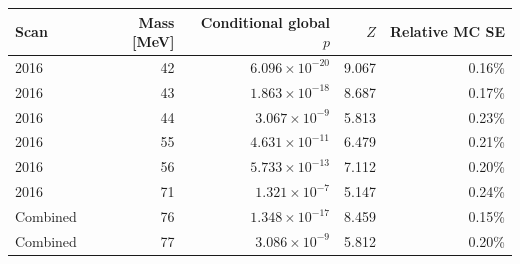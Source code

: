 \begin{tabular}{lrrrr}\toprule
Scan & Mass [MeV] & Conditional global $p$ & $Z$ & Relative MC SE\\\midrule
2016 & 42 & $6.096\times10^{-20}$ & 9.067 & 0.16\%\\
2016 & 43 & $1.863\times10^{-18}$ & 8.687 & 0.17\%\\
2016 & 44 & $3.067\times10^{-9}$ & 5.813 & 0.23\%\\
2016 & 55 & $4.631\times10^{-11}$ & 6.479 & 0.21\%\\
2016 & 56 & $5.733\times10^{-13}$ & 7.112 & 0.20\%\\
2016 & 71 & $1.321\times10^{-7}$ & 5.147 & 0.24\%\\
Combined & 76 & $1.348\times10^{-17}$ & 8.459 & 0.15\%\\
Combined & 77 & $3.086\times10^{-9}$ & 5.812 & 0.20\%\\
\bottomrule\end{tabular}
